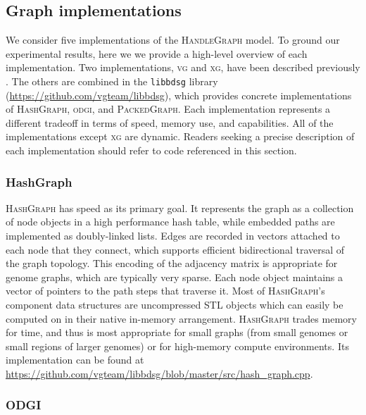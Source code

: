 \documentclass{article}
\begin{document}
\subsection{Graph implementations}

We consider five implementations of the \textsc{HandleGraph} model.
To ground our experimental results, here we we provide a high-level overview of each implementation.
Two implementations, \textsc{vg} and \textsc{xg}, have been described previously \cite{Garrison_2018,Garrison_2019}.
The others are combined in the \texttt{libbdsg} library (\url{https://github.com/vgteam/libbdsg}), which provides concrete implementations of \textsc{HashGraph}, \textsc{odgi}, and \textsc{PackedGraph}.
Each implementation represents a different tradeoff in terms of speed, memory use, and capabilities.
All of the implementations except \textsc{xg} are dynamic.
Readers seeking a precise description of each implementation should refer to code referenced in this section.

\subsubsection{HashGraph}

\textsc{HashGraph} has speed as its primary goal.
It represents the graph as a collection of node objects in a high performance hash table, while embedded paths are implemented as doubly-linked lists.
Edges are recorded in vectors attached to each node that they connect, which supports efficient bidirectional traversal of the graph topology.
This encoding of the adjacency matrix is appropriate for genome graphs, which are typically very sparse.
Each node object maintains a vector of pointers to the path steps that traverse it.
Most of \textsc{HashGraph}'s component data structures are uncompressed STL objects which can easily be computed on in their native in-memory arrangement.
\textsc{HashGraph} trades memory for time, and thus is most appropriate for small graphs (from small genomes or small regions of larger genomes) or for high-memory compute environments.
Its implementation can be found at \url{https://github.com/vgteam/libbdsg/blob/master/src/hash_graph.cpp}.

\subsubsection{ODGI}
\end{document}
